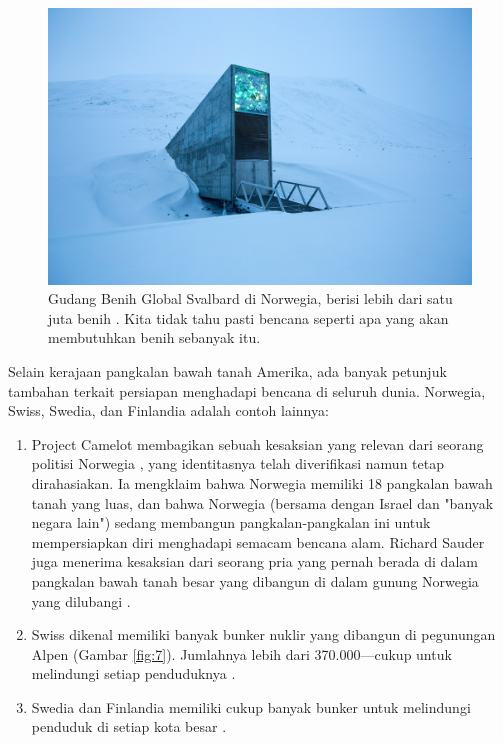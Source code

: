 \documentclass[10pt,twocolumn,letterpaper]{article}
\begin{document}
\begin{figure}[t]
\begin{center}
   \includegraphics[width=1\linewidth]{svalbard.jpg}
\end{center}
   \caption{Gudang Benih Global Svalbard di Norwegia, berisi lebih dari satu juta benih \cite{24}. Kita tidak tahu pasti bencana seperti apa yang akan membutuhkan benih sebanyak itu.}
\label{fig:8}
\label{fig:onecol}
\end{figure}

Selain kerajaan pangkalan bawah tanah Amerika, ada banyak petunjuk tambahan terkait persiapan menghadapi bencana di seluruh dunia. Norwegia, Swiss, Swedia, dan Finlandia adalah contoh lainnya:

\begin{flushleft}
\begin{enumerate}
    \item Project Camelot membagikan sebuah kesaksian yang relevan dari seorang politisi Norwegia \cite{25,26}, yang identitasnya telah diverifikasi namun tetap dirahasiakan. Ia mengklaim bahwa Norwegia memiliki 18 pangkalan bawah tanah yang luas, dan bahwa Norwegia (bersama dengan Israel dan "banyak negara lain") sedang membangun pangkalan-pangkalan ini untuk mempersiapkan diri menghadapi semacam bencana alam. Richard Sauder juga menerima kesaksian dari seorang pria yang pernah berada di dalam pangkalan bawah tanah besar yang dibangun di dalam gunung Norwegia yang dilubangi \cite{22}.
    \item Swiss dikenal memiliki banyak bunker nuklir yang dibangun di pegunungan Alpen (Gambar \ref{fig:7}). Jumlahnya lebih dari 370.000—cukup untuk melindungi setiap penduduknya \cite{27}.
    \item Swedia dan Finlandia memiliki cukup banyak bunker untuk melindungi penduduk di setiap kota besar \cite{27}. 
\end{enumerate}
\end{flushleft}
\end{document}

